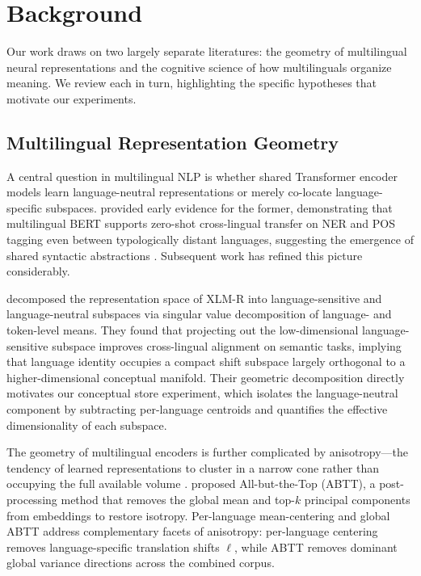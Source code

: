 \section{Background}

Our work draws on two largely separate literatures: the geometry of multilingual neural representations and the cognitive science of how multilinguals organize meaning.
We review each in turn, highlighting the specific hypotheses that motivate our experiments.

\subsection{Multilingual Representation Geometry}

A central question in multilingual NLP is whether shared Transformer encoder models \citep{vaswani2017} learn language-neutral representations or merely co-locate language-specific subspaces.
\citet{pires2019} provided early evidence for the former, demonstrating that multilingual BERT \citep{devlin2019} supports zero-shot cross-lingual transfer on NER and POS tagging even between typologically distant languages, suggesting the emergence of shared syntactic abstractions \citep{hewitt2019}.
Subsequent work has refined this picture considerably.

\citet{chang2022} decomposed the representation space of XLM-R \citep{conneau2020} into language-sensitive and language-neutral subspaces via singular value decomposition of language- and token-level means.
They found that projecting out the low-dimensional language-sensitive subspace improves cross-lingual alignment on semantic tasks, implying that language identity occupies a compact shift subspace largely orthogonal to a higher-dimensional conceptual manifold.
Their geometric decomposition directly motivates our conceptual store experiment, which isolates the language-neutral component by subtracting per-language centroids and quantifies the effective dimensionality of each subspace.

The geometry of multilingual encoders is further complicated by anisotropy---the tendency of learned representations to cluster in a narrow cone rather than occupying the full available volume \citep{ethayarajh2019,rajaee2022}.
\citet{mu2018} proposed All-but-the-Top (ABTT), a post-processing method that removes the global mean and top-$k$ principal components from embeddings to restore isotropy.
Per-language mean-centering and global ABTT address complementary facets of anisotropy: per-language centering removes language-specific translation shifts $\boldsymbol{\ell}$, while ABTT removes dominant global variance directions across the combined corpus.

